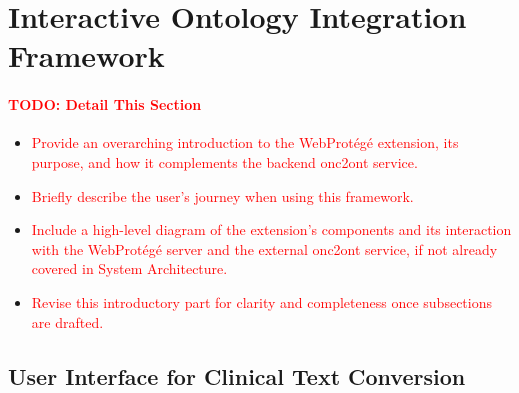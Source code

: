 
\section{Interactive Ontology Integration Framework}

\paragraph{\textcolor{red}{TODO: Detail This Section}}
\begin{itemize}
    \item[\textcolor{red}{$\bullet$}] \textcolor{red}{Provide an overarching introduction to the WebProtégé extension, its purpose, and how it complements the backend onc2ont service.}
    \item[\textcolor{red}{$\bullet$}] \textcolor{red}{Briefly describe the user's journey when using this framework.}
    \item[\textcolor{red}{$\bullet$}] \textcolor{red}{Include a high-level diagram of the extension's components and its interaction with the WebProtégé server and the external onc2ont service, if not already covered in System Architecture.}
    \item[\textcolor{red}{$\bullet$}] \textcolor{red}{Revise this introductory part for clarity and completeness once subsections are drafted.}
\end{itemize}

    \subsection{User Interface for Clinical Text Conversion}
